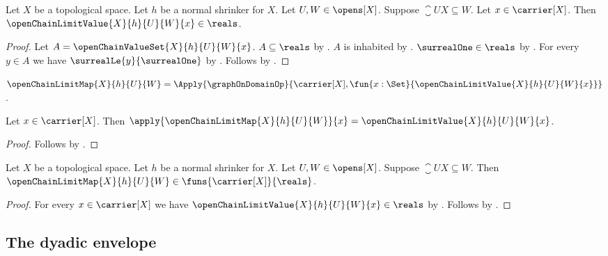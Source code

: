 \begin{proposition}\label{open_chain_limit_value_is_real}
    Let $X$ be a topological space.
    Let $h$ be a normal shrinker for $X$.
    Let $U,W\in\opens[X]$.
    Suppose $\closure{U}{X}\subseteq W$.
    Let $x\in\carrier[X]$.
    Then $\openChainLimitValue{X}{h}{U}{W}{x}\in\reals$.
\end{proposition}
\begin{proof}
    Let $A=\openChainValueSet{X}{h}{U}{W}{x}$.
    $A\subseteq\reals$ by .
    $A$ is inhabited by .
    $\surrealOne\in\reals$ by .
    For every $y\in A$ we have $\surrealLe{y}{\surrealOne}$
        by .
    Follows by .
\end{proof}

\begin{definition}\label{open_chain_limit_map}
    $\openChainLimitMap{X}{h}{U}{W}
        =\Apply{\graphOnDomainOp}
            {\carrier[X],\fun{x:\Set}{\openChainLimitValue{X}{h}{U}{W}{x}}}$.
\end{definition}

\begin{proposition}\label{open_chain_limit_map_apply}
    Let $x\in\carrier[X]$.
    Then $\apply{\openChainLimitMap{X}{h}{U}{W}}{x}
        =\openChainLimitValue{X}{h}{U}{W}{x}$.
\end{proposition}
\begin{proof}
    Follows by
        .
\end{proof}

\begin{theorem}\label{open_chain_limit_map_typed}
    Let $X$ be a topological space.
    Let $h$ be a normal shrinker for $X$.
    Let $U,W\in\opens[X]$.
    Suppose $\closure{U}{X}\subseteq W$.
    Then $\openChainLimitMap{X}{h}{U}{W}
        \in\funs{\carrier[X]}{\reals}$.
\end{theorem}
\begin{proof}
    For every $x\in\carrier[X]$ we have
        $\openChainLimitValue{X}{h}{U}{W}{x}\in\reals$
        by .
    Follows by
        .
\end{proof}

\subsection{The dyadic envelope}

